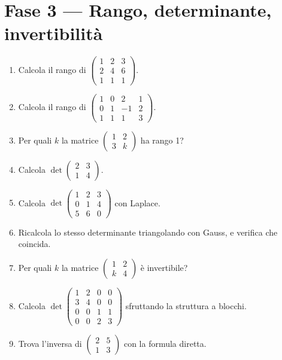 \documentclass[a4paper,11pt]{article}
\begin{document}
\section{Fase 3 --- Rango, determinante, invertibilità}
\begin{enumerate}
  \item Calcola il rango di $\begin{pmatrix}1&2&3\\2&4&6\\1&1&1\end{pmatrix}$.
  \item Calcola il rango di $\begin{pmatrix}1&0&2&1\\0&1&-1&2\\1&1&1&3\end{pmatrix}$.
  \item Per quali $k$ la matrice $\begin{pmatrix}1&2\\3&k\end{pmatrix}$ ha rango 1?
  \item Calcola $\det\begin{pmatrix}2&3\\1&4\end{pmatrix}$.
  \item Calcola $\det\begin{pmatrix}1&2&3\\0&1&4\\5&6&0\end{pmatrix}$ con Laplace.
  \item Ricalcola lo stesso determinante triangolando con Gauss, e verifica che coincida.
  \item Per quali $k$ la matrice $\begin{pmatrix}1&2\\k&4\end{pmatrix}$ è invertibile?
  \item Calcola $\det\begin{pmatrix}1&2&0&0\\3&4&0&0\\0&0&1&1\\0&0&2&3\end{pmatrix}$ sfruttando la struttura a blocchi.
  \item Trova l'inversa di $\begin{pmatrix}2&5\\1&3\end{pmatrix}$ con la formula diretta.

\end{enumerate}
\end{document}
